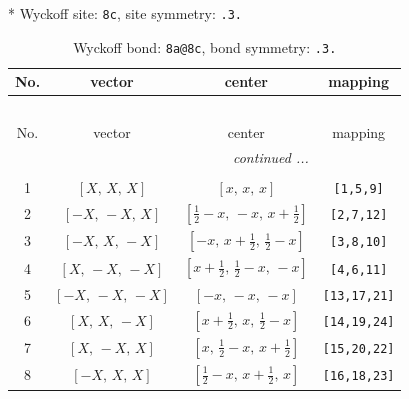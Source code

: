 \documentclass[fleqn,8pt]{jsarticle}
\begin{document}
* Wyckoff site: {\tt 8c}, site symmetry: {\tt .3.}
\renewcommand{\arraystretch}{1.2}
\begin{longtable}{cccc}
\caption{Wyckoff bond: {\tt 8a@8c}, bond symmetry: {\tt .3.}}
 \\
 \hline \hline
No. & vector & center & mapping \\ \hline \endfirsthead

\multicolumn{3}{l}{\tablename\ \thetable{}} \\
 \hline \hline
No. & vector & center & mapping \\ \hline \endhead

 \hline \hline
\multicolumn{3}{r}{\footnotesize\it continued ...} \\ \endfoot

 \hline \hline
\multicolumn{3}{r}{} \\ \endlastfoot

1 & $\left[ X,\, X,\, X \right]$ & $\left[ x,\, x,\, x \right]$ & {\tt [1,5,9]} \\ \hline
2 & $\left[ - X,\, - X,\, X \right]$ & $\left[ \frac{1}{2} - x,\, - x,\, x + \frac{1}{2} \right]$ & {\tt [2,7,12]} \\ \hline
3 & $\left[ - X,\, X,\, - X \right]$ & $\left[ - x,\, x + \frac{1}{2},\, \frac{1}{2} - x \right]$ & {\tt [3,8,10]} \\ \hline
4 & $\left[ X,\, - X,\, - X \right]$ & $\left[ x + \frac{1}{2},\, \frac{1}{2} - x,\, - x \right]$ & {\tt [4,6,11]} \\ \hline
5 & $\left[ - X,\, - X,\, - X \right]$ & $\left[ - x,\, - x,\, - x \right]$ & {\tt [13,17,21]} \\ \hline
6 & $\left[ X,\, X,\, - X \right]$ & $\left[ x + \frac{1}{2},\, x,\, \frac{1}{2} - x \right]$ & {\tt [14,19,24]} \\ \hline
7 & $\left[ X,\, - X,\, X \right]$ & $\left[ x,\, \frac{1}{2} - x,\, x + \frac{1}{2} \right]$ & {\tt [15,20,22]} \\ \hline
8 & $\left[ - X,\, X,\, X \right]$ & $\left[ \frac{1}{2} - x,\, x + \frac{1}{2},\, x \right]$ & {\tt [16,18,23]} \\
\end{longtable}
\renewcommand{\arraystretch}{1.2}
\end{document}
